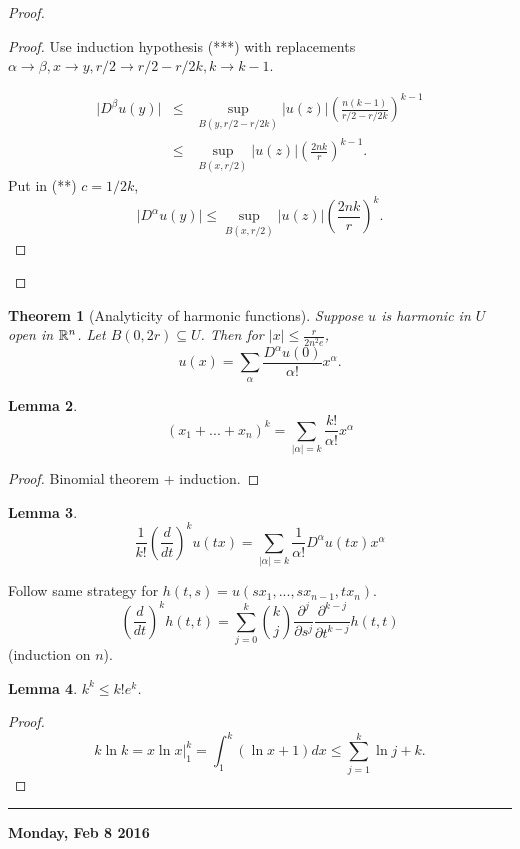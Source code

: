 \documentclass[11pt]{amsart}%
\newtheorem{theorem}{Theorem}
\newtheorem{lemma}[theorem]{Lemma}
\begin{document}
\begin{proof}
\begin{proof}
    Use induction hypothesis (***) with replacements $\alpha \to \beta, x\to y, r/2\to r/2-r/2k, k\to k-1$.
    
    \begin{eqnarray*}
        \vert D^\beta u(y)\vert &\le& \sup_{B(y,r/2-r/2k)} \vert u(z)\vert (\frac{n(k-1)}{r/2-r/2k})^{k-1}\\
                &\le& \sup_{B(x,r/2)} \vert u(z)\vert (\frac{2nk}{r})^{k-1}.
    \end{eqnarray*}
    Put in (**) $c=1/2k$,
    $$\vert D^\alpha u(y)\vert \le \sup_{B(x,r/2)} \vert u(z)\vert (\frac{2nk}{r})^k.$$
\end{proof}
\end{proof}

\begin{theorem}[Analyticity of harmonic functions]
Suppose $u$ is harmonic in $U$ open in $\mathbb{R}^n$. Let $B(0,2r)\subseteq U$. Then for $\vert x\vert \le \frac{r}{2n^2e}$,
$$u(x) =\sum_{\alpha}\frac{D^\alpha u(0)}{\alpha!}x^\alpha.$$
\end{theorem}

\begin{lemma}
    $$(x_1+...+x_n)^k =\sum_{\vert \alpha\vert=k} \frac{k!}{\alpha!} x^\alpha$$
\end{lemma}

\begin{proof}
    Binomial theorem + induction.
\end{proof}

\begin{lemma}
    $$\frac{1}{k!}(\frac{d}{dt})^k u(tx) =\sum_{\vert \alpha\vert =k} \frac{1}{\alpha!} D^\alpha u(tx)x^\alpha$$
\end{lemma}

Follow same strategy for $h(t,s) = u(sx_1,...,sx_{n-1}, tx_n)$.
$$(\frac{d}{dt})^kh(t,t) = \sum_{j=0}^k \binom{k}{j}\frac{\partial^j}{\partial s^j} \frac{\partial^{k-j}}{\partial t^{k-j}} h(t,t)$$
(induction on $n$).

\begin{lemma}
    $k^k\le k!e^k$.
\end{lemma}
\begin{proof}
    $$k\ln k = x\ln x\vert^k_1 = \int_1^k(\ln x+1)dx \le \sum_{j=1}^k\ln j+k.$$
\end{proof}

\begin{center}\rule{0.5\linewidth}{\linethickness}\end{center}

\textbf{Monday, Feb 8 2016}
\end{document}
